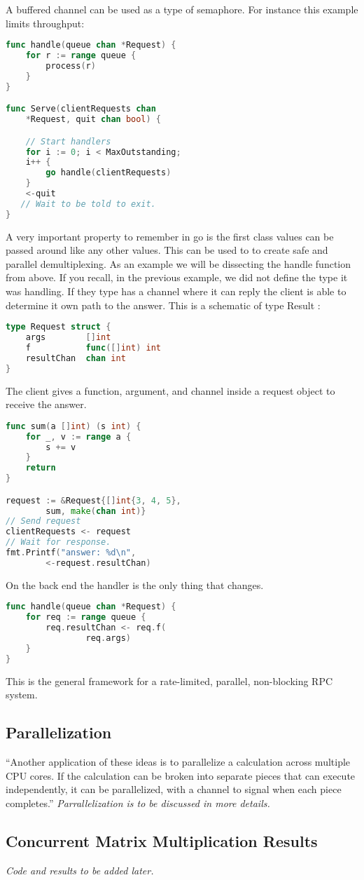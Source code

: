 	A buffered channel can be used as a type of semaphore. For instance this example limits throughput:
\begin{lstlisting}[language=Go]
func handle(queue chan *Request) {
    for r := range queue {
        process(r)
    }
}

func Serve(clientRequests chan
	*Request, quit chan bool) {

    // Start handlers
    for i := 0; i < MaxOutstanding;
    i++ {
        go handle(clientRequests)
    }
    <-quit
   // Wait to be told to exit.
}
\end{lstlisting}
A very important property to remember in go is the first class values can be passed around like any other values. This can be used to to create safe and parallel demultiplexing. As an example we will be dissecting the handle function from above. If you recall, in the previous example, we did not define the type it was handling. If they type has a channel where it can reply the client is able to determine it own path to the answer. This is a schematic of type Result :
\begin{lstlisting}[language=Go]
type Request struct {
    args        []int
    f           func([]int) int
    resultChan  chan int
}
\end{lstlisting}
The client gives a function, argument, and channel inside a request object to receive the answer.
\begin{lstlisting}[language=Go]
func sum(a []int) (s int) {
    for _, v := range a {
        s += v
    }
    return
}

request := &Request{[]int{3, 4, 5},
	 	sum, make(chan int)}
// Send request
clientRequests <- request
// Wait for response.
fmt.Printf("answer: %d\n",
		<-request.resultChan)
\end{lstlisting}
On the back end the handler is the only thing that changes.
\begin{lstlisting}[language=Go]
func handle(queue chan *Request) {
    for req := range queue {
        req.resultChan <- req.f(
			    req.args)
    }
}
\end{lstlisting}
This is the general framework for a rate-limited, parallel, non-blocking RPC system.
\subsection{Parallelization}
“Another application of these ideas is to parallelize a calculation across multiple CPU cores. If the calculation can be broken into separate pieces that can execute independently, it can be parallelized, with a channel to signal when each piece completes.”\cite{website:go-lang-documentation}
\emph{Parrallelization is to be discussed in more details.}
\subsection{Concurrent Matrix Multiplication Results}
\emph{Code and results to be added later.}
